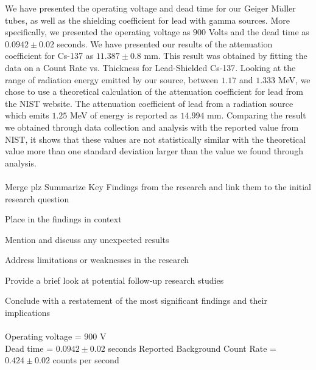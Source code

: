 We have presented the operating voltage and dead time for our Geiger M$\ddot{u}$ller tubes, as well as the shielding coefficient for lead with gamma sources. More specifically, we presented the operating voltage as $900$ Volts and the dead time as $0.0942 \pm 0.02$ seconds. We have presented our results of the attenuation coefficient for Cs-137 as $11.387 \pm 0.8$ mm. This result was obtained by fitting the data on a Count Rate vs. Thickness for Lead-Shielded Cs-137. Looking at the range of radiation energy emitted by our source, between $1.17$ and $1.333$ MeV, we chose to use a theoretical calculation of the attenuation coefficient for lead from the NIST website. The attenuation coefficient of lead from a radiation source which emits $1.25$ MeV of energy is reported as $14.994$ mm. Comparing the result we obtained through data collection and analysis with the reported value from NIST, it shows that these values are not statistically similar with the theoretical value more than one standard deviation larger than the value we found through analysis.
\\ \\
Merge plz
Summarize Key Findings from the research and link them to the initial research question

Place in the findings in context

Mention and discuss any unexpected results

Address limitations or weaknesses in the research

Provide a brief look at potential follow-up research studies

Conclude with a restatement of the most significant findings and their implications
\\ \\
Operating voltage = $900$ V \\
Dead time = $0.0942 \pm 0.02$ seconds
Reported Background Count Rate  = $0.424 \pm 0.02$ counts per second \\ 